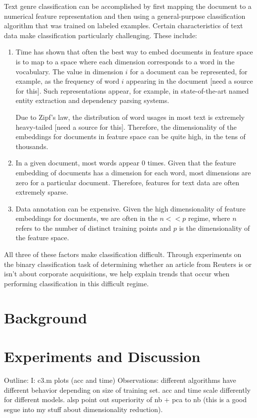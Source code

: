 \documentclass[]{article}
\begin{document}
Text genre classification can be accomplished by first mapping the document to a numerical feature representation and then using a general-purpose classification algorithm that was trained on labeled examples. Certain characteristics of text data make classification particularly challenging. These include:
\begin{enumerate}
\item Time has shown that often the best way to embed documents in feature space is to map to a space where each dimension corresponds to a word in the vocabulary. The value in dimension $i$ for a document can be represented, for example, as the frequency of word $i$ appearing in the document [need a source for this]. Such representations appear, for example, in state-of-the-art named entity extraction and dependency parsing systems.   
~\cite{ratinov2009design,nivre2004deterministic}

Due to Zipf's law, the distribution of word usages in most text is extremely heavy-tailed [need a source for this]. Therefore, the dimensionality of the embeddings for documents in feature space can be quite high, in the tens of thousands. 
\item  In a given document, most words appear 0 times. Given that the feature embedding of documents has a dimension for each word, most dimensions are zero for a particular document. Therefore, features for text data are often extremely sparse. 
\item Data annotation can be expensive. Given the high dimensionality of feature embeddings for documents, we are often in the $n << p$ regime, where $n$ refers to the number of distinct training points and $p$ is the dimensionality of the feature space. 
\end{enumerate}
All three of these factors make classification difficult. Through experiments on the binary classification task of determining whether an article from Reuters is or isn't about corporate acquisitions, we help explain trends that occur when performing classification in this difficult regime. 
\section{Background}
\section{Experiments and Discussion}
Outline: 
I: c3.m plots (acc and time)
Observations: different algorithms have different behavior depending on size of training set. acc and time scale differently for different models.
alsp point out superiority of nb + pca to nb (this is a good segue into my stuff about dimensionality reduction).
\end{document}
